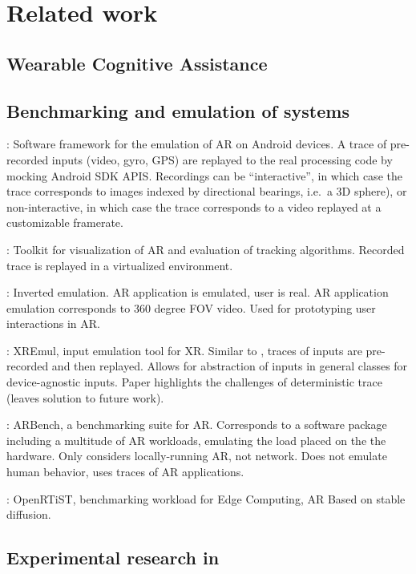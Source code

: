 \section{Related work}

\subsection{Wearable Cognitive Assistance}



\subsection{Benchmarking and emulation of  systems}

\textcite{munro2016aaremu}: Software framework for the emulation of AR on Android devices.
A trace of pre-recorded inputs (video, gyro, GPS) are replayed to the real processing code by mocking Android SDK APIS.
Recordings can be ``interactive'', in which case the trace corresponds to images indexed by directional bearings, i.e.\ a 3D sphere), or non-interactive, in which case the trace corresponds to a video replayed at a customizable framerate.

\textcite{williams2013transform}: Toolkit for visualization of AR and evaluation of tracking algorithms.
Recorded trace is replayed in a virtualized environment.


\textcite{berning2013parnorama}: Inverted emulation.
AR application is emulated, user is real.
AR application emulation corresponds to 360 degree FOV video.
Used for prototyping user interactions in AR.

\textcite{choi2022emulating}: XREmul, input emulation tool for XR.
Similar to \cite{munro2016aaremu}, traces of inputs are pre-recorded and then replayed.
Allows for abstraction of inputs in general classes for device-agnostic inputs.
Paper highlights the challenges of deterministic trace (leaves solution to future work).

\textcite{chetoui2022arbench}: ARBench, a benchmarking suite for AR.
Corresponds to a software package including a multitude of AR workloads, emulating the load placed on the the hardware.
Only considers locally-running AR, not network.
Does not emulate human behavior, uses traces of AR applications.

\textcite{george2020openrtist}: OpenRTiST, benchmarking workload for Edge Computing, AR
Based on stable diffusion. 


\subsection{Experimental research in }


